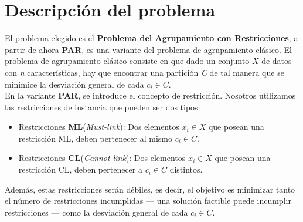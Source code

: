 \chapter{Descripción del problema}
El problema elegido es el \textbf{Problema del Agrupamiento con Restricciones}, a partir de ahora \textbf{PAR}, es una variante del problema de agrupamiento clásico.
El problema de agrupamiento clásico consiste en que dado un conjunto $ X $ de datos con \emph{n} características, hay que encontrar una partición \emph{C} de tal manera que se minimice la desviación general de cada $ c_{i} \in C $.\\
En la variante \textbf{PAR}, se introduce el concepto de restricción. Nosotros utilizamos las restricciones de instancia que pueden ser dos tipos:
\begin{itemize}
   \item Restricciones \textbf{ML}(\emph{Must-link}): Dos elementos $ x_{i} \in X $ que posean una restricción ML, deben pertenecer al mismo $ c_{i} \in C $.
   \item Restricciones \textbf{CL}(\emph{Cannot-link}): Dos elementos $ x_{i} \in X $ que posean una restricción CL, deben pertenecer a $ c_{i} \in C $ distintos.
\end{itemize}
Además, estas restricciones serán débiles, es decir, el objetivo es minimizar tanto el número de restricciones incumplidas --- una solución factible puede incumplir restricciones --- como la desviación general de cada $ c_{i} \in C $.
